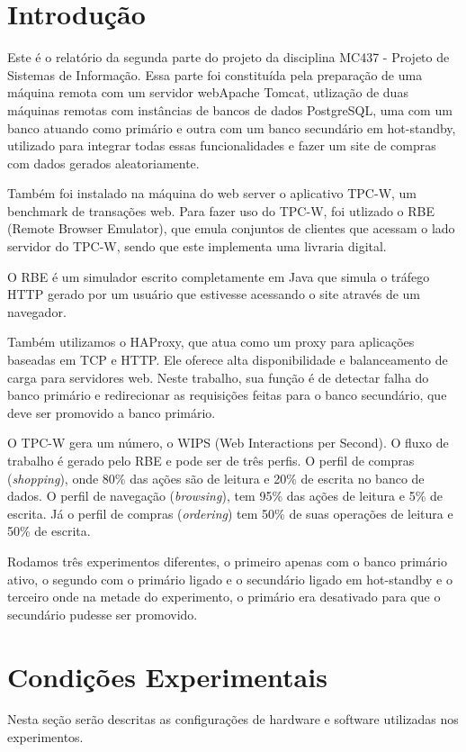 \documentclass[11pt,twoside]{article}
\begin{document}
\section{Introdução}
Este \'e o relat\'orio da segunda parte do projeto da disciplina MC437 - Projeto de Sistemas de Informação. Essa parte foi constituída pela preparação de uma m\'aquina remota com um servidor  webApache Tomcat, utlização de duas máquinas remotas com instâncias de bancos de dados PostgreSQL, uma com um banco atuando como primário e outra com um banco secundário em hot-standby, utilizado para integrar todas essas funcionalidades e fazer um site de compras com dados gerados aleatoriamente.

    Também foi instalado na máquina do web server o aplicativo TPC-W, um benchmark de transa\c{c}\~oes web. Para fazer uso do TPC-W, foi utlizado o RBE (Remote Browser Emulator), que emula conjuntos de clientes que acessam o lado servidor do TPC-W, sendo que este implementa uma livraria digital.

    O RBE \'e um simulador escrito completamente em Java que simula o tr\'afego HTTP gerado por um usu\'ario que estivesse acessando o site atrav\'es de um navegador.

    Também utilizamos o HAProxy, que atua como um proxy para aplicações baseadas em TCP e HTTP. Ele oferece alta disponibilidade e balanceamento de carga para servidores web. Neste trabalho, sua função é de detectar falha do banco primário e redirecionar as requisições feitas para o banco secundário, que deve ser promovido a banco primário.

    O TPC-W gera um n\'umero, o WIPS (Web Interactions per Second). O fluxo de trabalho é gerado pelo RBE e pode ser de tr\^es perfis. O perfil de compras (\textit{shopping}), onde 80\% das a\c{c}\~oes são de leitura e 20\% de escrita no banco de dados. O perfil de navega\c{c}\~ao (\textit{browsing}), tem 95\% das a\c{c}\~oes de leitura e 5\% de escrita. J\'a o perfil de compras (\textit{ordering}) tem 50\% de suas opera\c{c}\~oes de leitura e 50\% de escrita.

    Rodamos três experimentos diferentes, o primeiro apenas com o banco primário ativo, o segundo com o primário ligado e o secundário ligado em hot-standby e o terceiro onde na metade do experimento, o primário era desativado para que o secundário pudesse ser promovido.

\setlength{\parindent}{4ex}


\section{Condições Experimentais}
\setlength{\parindent}{4ex}
     Nesta se\c{c}\~ao ser\~ao descritas as configura\c{c}\~oes de hardware e software utilizadas nos experimentos.
\end{document}
